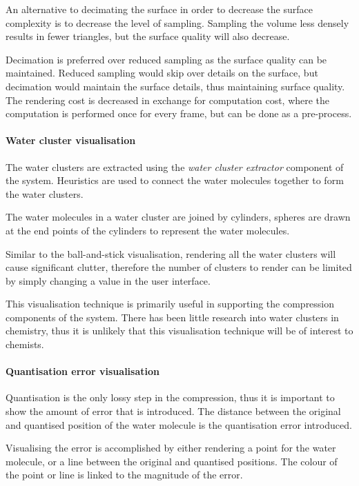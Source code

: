 An alternative to decimating the surface in order to decrease the surface
complexity is to decrease the level of sampling. Sampling the volume less
densely results in fewer triangles, but the surface quality will also decrease.

Decimation is preferred over reduced sampling as the surface quality can be
maintained. Reduced sampling would skip over details on the surface, but
decimation would maintain the surface details, thus maintaining surface
quality. The rendering cost is decreased in exchange for computation cost,
where the computation is performed once for every frame, but can be done as a
pre-process.


\paragraph{Water cluster visualisation}

The water clusters are extracted using the \emph{water cluster extractor}
component of the system. Heuristics are used to connect the water molecules
together to form the water clusters.

The water molecules in a water cluster are joined by cylinders, spheres are
drawn at the end points of the cylinders to represent the water molecules.

Similar to the ball-and-stick visualisation, rendering all the water clusters
will cause significant clutter, therefore the number of clusters to render can
be limited by simply changing a value in the user interface.

This visualisation technique is primarily useful in supporting the compression
components of the system. There has been little research into water clusters in
chemistry, thus it is unlikely that this visualisation technique will be of
interest to chemists.


\paragraph{Quantisation error visualisation}

Quantisation is the only lossy step in the compression, thus it is important to
show the amount of error that is introduced. The distance between the original
and quantised position of the water molecule is the quantisation error
introduced.

Visualising the error is accomplished by either rendering a point for the water
molecule, or a line between the original and quantised positions. The colour of
the point or line is linked to the magnitude of the error.

